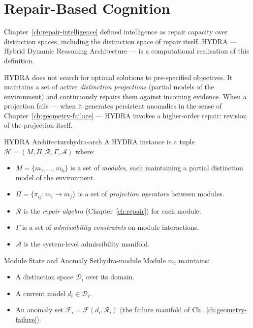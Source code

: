 \documentclass[12pt,twoside,openright]{book}
\newcommand{\adm}{\mathcal{A}}
\begin{document}
\section{Repair-Based Cognition}

Chapter~\ref{ch:repair-intelligence} defined intelligence
as repair capacity over distinction spaces, including
the distinction space of repair itself. HYDRA —
Hybrid Dynamic Reasoning Architecture — is a
computational realisation of this definition.

HYDRA does not search for optimal solutions to
pre-specified objectives. It maintains a set of
active \emph{distinction projections} (partial models
of the environment) and continuously repairs them
against incoming evidence. When a projection fails —
when it generates persistent anomalies in the sense of
Chapter~\ref{ch:geometry-failure} — HYDRA invokes a
higher-order repair: revision of the projection itself.

\begin{definition}{HYDRA Architecture}{hydra-arch}
  A HYDRA instance is a tuple
  $\mathcal{H} = (M, \Pi, \mathcal{R}, \Gamma, \adm)$
  where:
  \begin{itemize}[nosep]
    \item $M = \{m_1, \ldots, m_k\}$ is a set of
          \emph{modules}, each maintaining a partial
          distinction model of the environment.
    \item $\Pi = \{\pi_{ij} : m_i \to m_j\}$ is a set
          of \emph{projection operators} between modules.
    \item $\mathcal{R}$ is the \emph{repair algebra}
          (Chapter~\ref{ch:repair}) for each module.
    \item $\Gamma$ is a set of \emph{admissibility
          constraints} on module interactions.
    \item $\adm$ is the system-level admissibility
          manifold.
  \end{itemize}
\end{definition}

\begin{definition}{Module State and Anomaly Set}{hydra-module}
  Module $m_i$ maintains:
  \begin{itemize}[nosep]
    \item A distinction space $\mathcal{D}_i$ over its
          domain.
    \item A current model $d_i \in \mathcal{D}_i$.
    \item An anomaly set
          $\mathcal{F}_i = \mathcal{F}(d_i, \mathcal{R}_i)$
          (the failure manifold of Ch.~\ref{ch:geometry-failure}).
  \end{itemize}
\end{definition}
\end{document}
